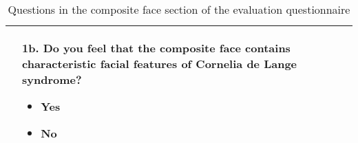 \documentclass[../report.tex]{subfiles}
\begin{document}
\begin{table}[H]
\begin{tabular}{ | c | m{7cm} |}
    	&
    	1b. Do you feel that the composite face contains characteristic facial features of
    	Cornelia de Lange syndrome?
    	\begin{itemize}
    		\item Yes
    		\item No
    	\end{itemize}
    	
    	\\ \hline
    	\end{tabular}
    	\caption{Questions in the composite face section of the evaluation questionnaire}\label{tbl_comp_face}
    \end{table}
    
    
    
    
    
    
    
    
    
    
\end{document}
